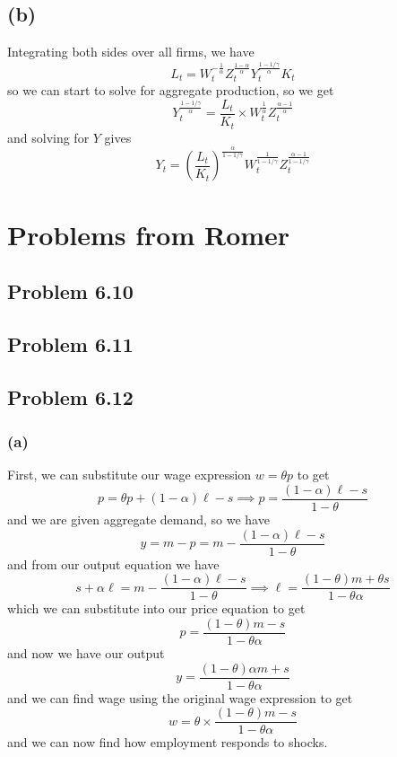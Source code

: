 \documentclass[11pt]{amsart}
\begin{document}
\subsection*{(b)}

Integrating both sides over all firms, we have
\[
L_t = W_t^{-\frac{1}{\alpha}} Z_t^{\frac{1-\alpha}{\alpha}} Y_t^{\frac{1-1/\gamma}{\alpha}} K_t
\]
so we can start to solve for aggregate production, so we get
\[
Y_t^{\frac{1-1/\gamma}{\alpha}} = \frac{L_t}{K_t} \times W_t^{\frac{1}{\alpha}} Z_t^{\frac{\alpha - 1}{\alpha}}
\]
and solving for $Y$ gives
\[
Y_t = \left(\frac{L_t}{K_t} \right)^{\frac{\alpha}{1-1/\gamma}} W_t^{\frac{1}{1-1/\gamma}} Z_t^{\frac{\alpha - 1}{1-1/\gamma}}
\]



\section{Problems from Romer}
\subsection{Problem 6.10}

\subsection{Problem 6.11}

\subsection{Problem 6.12}

\subsubsection*{(a)}
First, we can substitute our wage expression $w = \theta p$ to get
\[
p = \theta p + (1-\alpha) \ell - s \implies p = \frac{(1-\alpha) \ell - s}{1-\theta}
\]
and we are given aggregate demand, so we have
\[
y = m - p = m - \frac{(1-\alpha) \ell - s}{1-\theta}
\]
and from our output equation we have
\[
s + \alpha \ell = m - \frac{(1-\alpha) \ell - s}{1-\theta} \implies \ell = \frac{(1-\theta) m + \theta s}{1-\theta \alpha}
\]
which we can substitute into our price equation to get
\[
p = \frac{(1-\theta) m - s}{1-\theta \alpha}
\]
and now we have our output
\[
y = \frac{(1-\theta) \alpha m + s}{1-\theta \alpha}
\]
and we can find wage using the original wage expression to get
\[
w = \theta \times \frac{(1-\theta) m - s}{1-\theta \alpha}
\]
and we can now find how employment responds to shocks.
\end{document}

